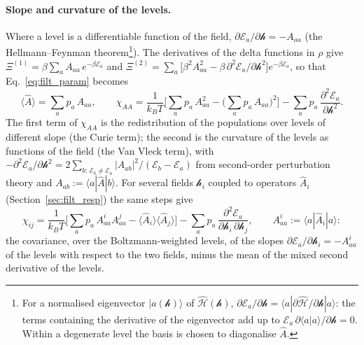 \documentclass[10pt,a4paper]{article}
\theoremstyle{plain}
\newcommand{\hfield}{\mathscr{h}}  %
\newcommand{\enrg}{\mathcal{E}}  %
\begin{document}
\paragraph{Slope and curvature of the levels.} Where a level is a
differentiable function of the field,
$ \partial\enrg_a/\partial \hfield = -A_{aa} $ (the Hellmann--Feynman
theorem\footnote{For a normalised eigenvector $ |a(\hfield)\rangle $ of
$ \hat{\mathcal{H}}(\hfield) $,
$ \partial\enrg_a/\partial \hfield = \langle a|\partial\hat{\mathcal{H}}/\partial \hfield|a\rangle $:
the terms containing the derivative of the eigenvector add up to
$ \enrg_a\,\partial\langle a|a\rangle/\partial \hfield = 0 $. Within a
degenerate level the basis is chosen to diagonalise $\hat A$.}). The
derivatives of the delta functions in $\rho$ give
$ \Xi^{(1)} = \beta\sum_aA_{aa}\,e^{-\beta\enrg_a} $ and
$ \Xi^{(2)} = \sum_a\big[\beta^{2}A_{aa}^{2} - \beta\,\partial^{2}\enrg_a/\partial \hfield^{2}\big]e^{-\beta\enrg_a} $,
so that Eq.~\eqref{eq:filt_param} becomes
\begin{equation}\label{eq:filt_vanvleck}
  \langle\hat A\rangle = \sum_ap_a\,A_{aa} , \qquad
  \chi_{AA} = \frac{1}{k_BT}\Big[\sum_ap_a\,A_{aa}^{2} - \Big(\sum_ap_a\,A_{aa}\Big)^{2}\Big]
  - \sum_ap_a\,\frac{\partial^{2}\enrg_a}{\partial \hfield^{2}} .
\end{equation}
The first term of $ \chi_{AA} $ is the redistribution of the populations
over levels of different slope (the Curie term); the second is the
curvature of the levels as functions of the field (the Van Vleck term),
with
$ -\partial^{2}\enrg_a/\partial \hfield^{2} = 2\sum_{b:\,\enrg_b\neq\enrg_a}|A_{ab}|^{2}/(\enrg_b - \enrg_a) $
from second-order perturbation theory and
$ A_{ab} := \langle a|\hat A|b\rangle $. For several fields $\hfield_i$
coupled to operators $\hat A_i$ (Section~\ref{sec:filt_resp}) the same steps
give
\begin{equation}\label{eq:filt_corr}
  \chi_{ij}=\frac{1}{k_BT}\Big[\sum_ap_a\,A^{i}_{aa}A^{j}_{aa}
  -\langle\hat A_i\rangle\langle\hat A_j\rangle\Big]
  -\sum_ap_a\,\frac{\partial^{2}\enrg_a}{\partial \hfield_i\,\partial \hfield_j} ,
  \qquad A^{i}_{aa}:=\langle a|\hat A_i|a\rangle :
\end{equation}
the covariance, over the Boltzmann-weighted levels, of the slopes
$\partial\enrg_a/\partial\hfield_i=-A^{i}_{aa}$ of the levels with respect to
the two fields, minus the mean of the mixed second derivative of the levels.
\end{document}
